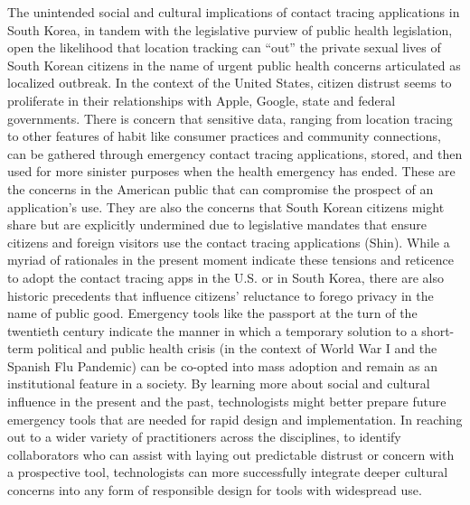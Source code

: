 \documentclass[11pt,dvipdfm]{article}
\begin{document}
The unintended social and cultural implications of contact tracing applications in South Korea, in tandem with the legislative purview of public health legislation, open the likelihood that location tracking can “out” the private sexual lives of South Korean citizens in the name of urgent public health concerns articulated as localized outbreak.  In the context of the United States, citizen distrust seems to proliferate in their relationships with Apple, Google, state and federal governments.  There is concern that sensitive data, ranging from location tracing to other features of habit like consumer practices and community connections, can be gathered through emergency contact tracing applications, stored, and then used for more sinister purposes when the health emergency has ended.  These are the concerns in the American public that can compromise the prospect of an application’s use.  They are also the concerns that South Korean citizens might share but are explicitly undermined due to legislative mandates that ensure citizens and foreign visitors use the contact tracing applications (Shin).   While a myriad of rationales in the present moment indicate these tensions and reticence to adopt the contact tracing apps in the U.S. or in South Korea, there are also historic precedents that influence citizens’ reluctance to forego privacy in the name of public good.  Emergency tools like the passport at the turn of the twentieth century indicate the manner in which a temporary solution to a short-term political and public health crisis (in the context of World War I and the Spanish Flu Pandemic) can be co-opted into mass adoption and remain as an institutional feature in a society.   By learning more about social and cultural influence in the present and the past, technologists might better prepare future emergency tools that are needed for rapid design and implementation.  In reaching out to a wider variety of practitioners across the disciplines, to identify collaborators who can assist with laying out predictable distrust or concern with a prospective tool, technologists can more successfully integrate deeper cultural concerns into any form of responsible design for tools with widespread use.
\end{document}
